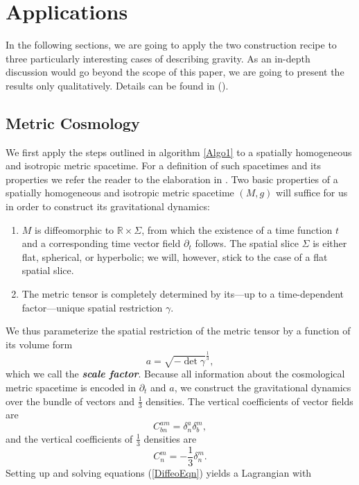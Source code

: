 \documentclass[%
preprint,
nofootinbib,
amsmath,amssymb,
aps,
prd,
floatfix,
]{revtex4-2}
\begin{document}
\section{Applications}
In the following sections, we are going to apply the two construction recipe
to three particularly interesting cases of describing gravity. 
As an in-depth discussion would go beyond the scope of this paper, we are going to present the results only qualitatively. Details can be found in (\cite{TobiMaster}).

\subsection{Metric Cosmology}
We first apply the steps outlined in algorithm \ref{Algo1} to a spatially homogeneous and isotropic metric spacetime. For a definition of such spacetimes and its properties we refer the reader to the elaboration in \cite{Wald}.
Two basic properties of a spatially homogeneous and isotropic metric spacetime $(M, g)$ will suffice for us in order to construct its gravitational dynamics:
\begin{enumerate}
    \item $M$ is diffeomorphic to $\mathbb R \times \Sigma$, from which the existence of a time function $t$ and a corresponding time vector field $\partial_t$ follows. The spatial slice $\Sigma$ is either flat, spherical, or hyperbolic; we will, however, stick to the case of a flat spatial slice.
    \item The metric tensor is completely determined by its---up to a time-dependent factor---unique spatial restriction $\gamma$.
\end{enumerate}
We thus parameterize the spatial restriction of the metric tensor by a function of its volume form
\begin{equation}
    a = \sqrt{-\operatorname{det}\gamma}^\frac{1}{3},
\end{equation}
which we call the \textbf{\textit{scale factor}}. Because all information about the cosmological metric spacetime is encoded in $\partial_t$ and $a$, we construct the gravitational dynamics over the bundle of vectors and $\frac{1}{3}$ densities. The vertical coefficients of vector fields are
\begin{equation}
    C^{a m}_{b n} = \delta^{a}_{n} \delta^{m}_{b},
\end{equation}
and the vertical coefficients of $\frac{1}{3}$ densities are
\begin{equation}
    C^{m}_{n} = -\frac{1}{3} \delta^{m}_{n}.
\end{equation}
Setting up and solving equations (\ref{DiffeoEqn}) yields a Lagrangian with
\end{document}
